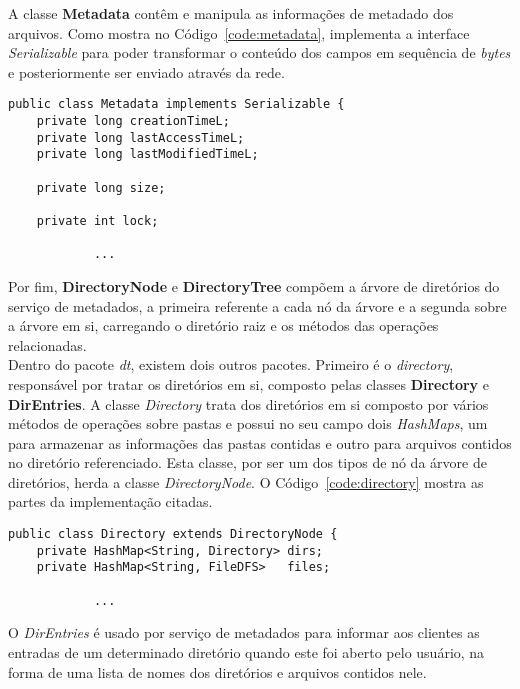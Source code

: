 A classe \textbf{Metadata} contêm e manipula as informações de metadado dos arquivos. 
Como mostra no Código~\ref{code:metadata}, implementa a interface \textit{Serializable} para poder transformar o conteúdo dos campos em sequência de \textit{bytes} e posteriormente ser enviado através da rede.

\begin{lstlisting}[basicstyle=\ttfamily\footnotesize, frame=single, caption=Classe Metadata, label=code:metadata]	
public class Metadata implements Serializable {
	private long creationTimeL;
	private long lastAccessTimeL;
	private long lastModifiedTimeL;
	
	private long size;
	
	private int lock;
	
			...
\end{lstlisting}	

Por fim, \textbf{DirectoryNode} e \textbf{DirectoryTree} compõem a árvore de diretórios do serviço de metadados, a primeira referente a cada nó da árvore e a segunda sobre a árvore em si, carregando o diretório raiz e os métodos das operações relacionadas.
\\

Dentro do pacote \textit{dt}, existem dois outros pacotes.
Primeiro é o \textit{directory}, responsável por tratar os diretórios em si, composto pelas classes \textbf{Directory} e \textbf{DirEntries}.
A classe \textit{Directory} trata dos diretórios em si composto por vários métodos de operações sobre pastas e possui no seu campo dois \textit{HashMaps}, um para armazenar as informações das pastas contidas e outro para arquivos contidos no diretório referenciado.
Esta classe, por ser um dos tipos de nó da árvore de diretórios, herda a classe \textit{DirectoryNode}.
O Código~\ref{code:directory} mostra as partes da implementação citadas.
\begin{lstlisting}[basicstyle=\ttfamily\footnotesize, frame=single, caption=Declaração e os campos da classe Directory, label=code:directory]
public class Directory extends DirectoryNode {
	private HashMap<String, Directory> dirs;
	private HashMap<String, FileDFS>   files;
	
			...
\end{lstlisting}

O \textit{DirEntries} é usado por serviço de metadados para informar aos clientes as entradas de um determinado diretório quando este foi aberto pelo usuário, na forma de uma lista de nomes dos diretórios e arquivos contidos nele. 
\\

